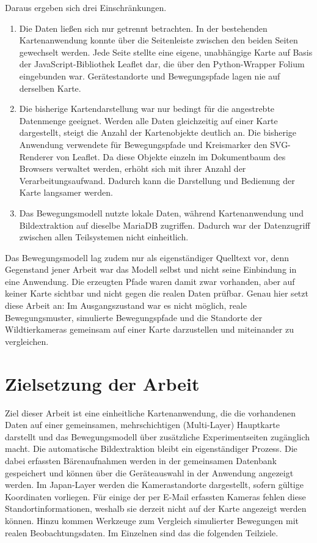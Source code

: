 \documentclass[12pt,a4paper]{report}
\begin{document}
Daraus ergeben sich drei Einschränkungen.


\begin{enumerate}
    \item Die Daten ließen sich nur getrennt betrachten.
    In der bestehenden Kartenanwendung konnte über die
    Seitenleiste zwischen den beiden Seiten gewechselt
    werden. Jede Seite stellte eine eigene, unabhängige
    Karte auf Basis der JavaScript-Bibliothek Leaflet dar,
    die über den Python-Wrapper Folium eingebunden war.
    Gerätestandorte und Bewegungspfade lagen nie auf
    derselben Karte.

    \item Die bisherige Kartendarstellung war nur bedingt
    für die angestrebte Datenmenge geeignet. Werden alle
    Daten gleichzeitig auf einer Karte dargestellt,
    steigt die Anzahl der Kartenobjekte deutlich an.
    Die bisherige Anwendung verwendete für Bewegungspfade
    und Kreismarker den SVG-Renderer von Leaflet.
    Da diese Objekte einzeln im Dokumentbaum des Browsers
    verwaltet werden, erhöht sich mit ihrer Anzahl der
    Verarbeitungsaufwand. Dadurch kann die Darstellung
    und Bedienung der Karte langsamer werden.

    \item Das Bewegungsmodell nutzte lokale Daten, während
    Kartenanwendung und Bildextraktion auf dieselbe MariaDB
    zugriffen. Dadurch war der Datenzugriff zwischen allen
    Teilsystemen nicht einheitlich.
\end{enumerate}


Das Bewegungsmodell lag zudem nur als eigenständiger Quelltext vor, denn Gegenstand jener
Arbeit war das Modell selbst und nicht seine Einbindung in eine Anwendung. Die erzeugten
Pfade waren damit zwar vorhanden, aber auf keiner Karte sichtbar und nicht gegen die realen
Daten prüfbar. Genau hier setzt diese Arbeit an: Im Ausgangszustand war es nicht möglich, reale Bewegungsmuster, simulierte Bewegungspfade und die Standorte der Wildtierkameras gemeinsam auf einer Karte darzustellen und miteinander zu vergleichen.

\section{Zielsetzung der Arbeit}
\label{sec:zielsetzung}


Ziel dieser Arbeit ist eine einheitliche Kartenanwendung,
die die vorhandenen Daten auf einer gemeinsamen,
mehrschichtigen (Multi-Layer) Hauptkarte darstellt
und das Bewegungsmodell über zusätzliche Experimentseiten
zugänglich macht. Die automatische Bildextraktion bleibt
ein eigenständiger Prozess. Die dabei erfassten
Bärenaufnahmen werden in der gemeinsamen Datenbank
gespeichert und können über die Geräteauswahl in der
Anwendung angezeigt werden. Im Japan-Layer werden
die Kamerastandorte dargestellt, sofern gültige
Koordinaten vorliegen. Für einige der per E-Mail
erfassten Kameras fehlen diese Standortinformationen,
weshalb sie derzeit nicht auf der Karte angezeigt
werden können. Hinzu kommen Werkzeuge zum Vergleich
simulierter Bewegungen mit realen Beobachtungsdaten.
Im Einzelnen sind das die folgenden Teilziele.
\end{document}
